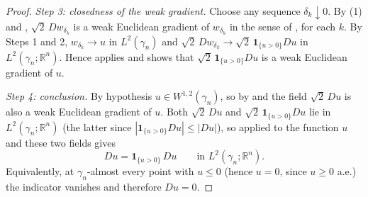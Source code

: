\begin{proof}
\emph{Step 3: closedness of the weak gradient.}
Choose any sequence $\delta_k \downarrow 0$.  By (1) and ,
$\sqrt2\, Dw_{\delta_k}$ is a weak Euclidean gradient of $w_{\delta_k}$ in the
sense of , for each $k$.  By Steps 1 and 2,
$w_{\delta_k} \to u$ in $L^2(\gamma_n)$ and
$\sqrt2\,Dw_{\delta_k} \to \sqrt2\,\mathbf{1}_{\{u>0\}}Du$ in
$L^2(\gamma_n;\mathbb{R}^n)$.  Hence  applies and
shows that $\sqrt2\,\mathbf{1}_{\{u>0\}}Du$ is a weak Euclidean gradient of $u$.

\emph{Step 4: conclusion.}
By hypothesis $u \in W^{1,2}(\gamma_n)$, so by  and
 the field $\sqrt2\,Du$ is also a weak Euclidean gradient of $u$.
Both $\sqrt2\,Du$ and $\sqrt2\,\mathbf{1}_{\{u>0\}}Du$ lie in
$L^2(\gamma_n;\mathbb{R}^n)$ (the latter since
$|\mathbf{1}_{\{u>0\}}Du| \leq |Du|$), so  applied to
the function $u$ and these two fields gives
\[
  Du = \mathbf{1}_{\{u>0\}}\, Du
  \qquad\text{in } L^2(\gamma_n;\mathbb{R}^n).
\]
Equivalently, at $\gamma_n$-almost every point with $u \leq 0$ (hence $u = 0$,
since $u \geq 0$ a.e.) the indicator vanishes and therefore $Du = 0$.
\end{proof}
